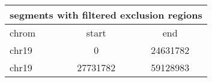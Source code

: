 \documentclass{standalone}
\begin{document}
\begin{tabular}{|l|c|c|}
\hline
\multicolumn{3}{|c|}{\textbf{segments with filtered exclusion regions}}\\
\hline 

chrom & start & end \\
\hline
chr19 & 0 & 24631782 \\
chr19 & 27731782 & 59128983 \\
\hline
\end{tabular}
\end{document}
